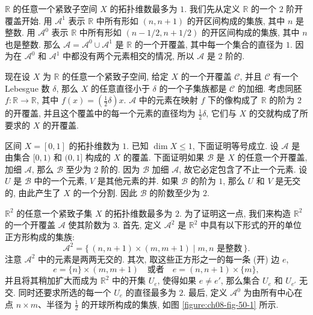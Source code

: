 \begin{example}
\label{example:ch08-sec50-1}
$\mathbb{R}$ 的任意一个紧致子空间 $X$ 的拓扑维数最多为 $1$. 我们先从定义 $\mathbb{R}$ 的一个 $2$ 阶开覆盖开始. 用 $\mathcal{A}^{1}$ 表示 $\mathbb{R}$ 中所有形如 $(n,n+1)$ 的开区间构成的集族, 其中 $n$ 是整数. 用 $\mathcal{A}^{0}$ 表示 $\mathbb{R}$ 中所有形如 $(n-1/2,n+1/2)$ 的开区间构成的集族, 其中 $n$ 也是整数. 那么 $\mathcal{A}=\mathcal{A}^{0}\cup\mathcal{A}^{1}$ 是 $\mathbb{R}$ 的一个开覆盖, 其中每一个集合的直径为 $1$. 因为在 $\mathcal{A}^{0}$ 和 $\mathcal{A}^{1}$ 中都没有两个元素相交的情况, 所以 $\mathcal{A}$ 是 $2$ 阶的.

现在设 $X$ 为 $\mathbb{R}$ 的任意一个紧致子空间, 给定 $X$ 的一个开覆盖 $\mathcal{C}$, 并且 $\mathcal{C}$ 有一个 Lebesgue 数 $\delta$, 那么 $X$ 的任意直径小于 $\delta$ 的一个子集族都是 $\mathcal{C}$ 的加细. 考虑同胚 $f\colon\mathbb{R}\to\mathbb{R}$, 其中 $f(x)=\left(\frac{1}{2}\delta\right)x$. $\mathcal{A}$ 中的元素在映射 $f$ 下的像构成了 $\mathbb{R}$ 的阶为 $2$ 的开覆盖, 并且这个覆盖中的每一个元素的直径均为 $\frac{1}{2}\delta$, 它们与 $X$ 的交就构成了所要求的 $X$ 的开覆盖.
\end{example}

\begin{example}
\label{example:ch08-sec50-2}
区间 $X=[0,1]$ 的拓扑维数为 $1$. 已知 $\dim X\leqslant 1$, 下面证明等号成立. 设 $\mathcal{A}$ 是由集合 $[0,1)$ 和 $(0,1]$ 构成的 $X$ 的覆盖. 下面证明如果 $\mathcal{B}$ 是 $X$ 的任意一个开覆盖, 加细 $\mathcal{A}$, 那么 $\mathcal{B}$ 至少为 $2$ 阶的. 因为 $\mathcal{B}$ 加细 $\mathcal{A}$, 故它必定包含了不止一个元素. 设 $U$ 是 $\mathcal{B}$ 中的一个元素, $V$ 是其他元素的并. 如果 $\mathcal{B}$ 的阶为 $1$, 那么 $U$ 和 $V$ 是无交的, 由此产生了 $X$ 的一个分割. 因此 $\mathcal{B}$ 的阶数至少为 $2$.
\end{example}

\begin{example}
\label{example:ch08-sec50-3}
$\mathbb{R}^{2}$ 的任意一个紧致子集 $X$ 的拓扑维数最多为 $2$. 为了证明这一点, 我们来构造 $\mathbb{R}^{2}$ 的一个开覆盖 $\mathcal{A}$ 使其阶数为 $3$. 首先, 定义 $\mathcal{A}^{2}$ 是 $\mathbb{R}^{2}$ 中具有以下形式的开的单位正方形构成的集族:
\[
\mathcal{A}^{2}=\{\,(n,n+1)\times(m,m+1)\mid m,n\text{ 是整数}\,\}.
\]
注意 $\mathcal{A}^{2}$ 中的元素是两两无交的. 其次, 取这些正方形之一的每一条 (开) 边 $e$,
\[
e=\{n\}\times(m,m+1)\quad\text{或者}\quad e=(n,n+1)\times\{m\},
\]
并且将其稍加扩大而成为 $\mathbb{R}^{2}$ 中的开集 $U_e$, 使得如果 $e\neq e'$, 那么集合 $U_e$ 和 $U_{e'}$ 无交. 同时还要求所选的每一个 $U_e$ 的直径最多为 $2$. 最后, 定义 $\mathcal{A}^{0}$ 为由所有中心在点 $n\times m$、半径为 $\frac{1}{2}$ 的开球所构成的集族, 如图 \cref{figure:ch08-fig-50-1} 所示.
\end{example}

